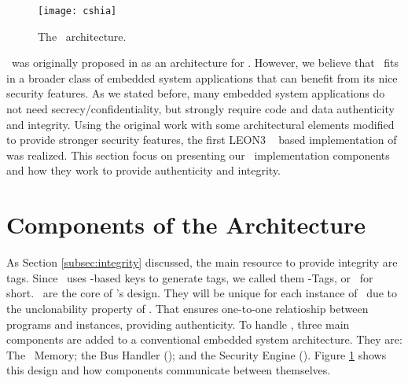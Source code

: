 

\begin{figure}[!ht]
	\centering
	\texttt{[image: cshia]}
	\caption{The \cshia~architecture.}
	\label{fig:cshia}
\end{figure}

\cshia~was originally proposed in \cite{Hoffman2015} as an architecture for \iot. However, we believe that \cshia~fits in a broader class of embedded system applications that can benefit from its nice security features. As we stated before, many embedded system applications do not need secrecy\slash{}confidentiality, but strongly require code and data authenticity and integrity. 
Using the original work with some architectural elements modified to provide stronger security features, the first LEON3 \fpga~ based implementation of \cshia was realized. This section focus on presenting our \cshia~implementation components and how they work to provide authenticity and integrity.

\section{Components of the Architecture}
\label{sec:Components-of-the-Architecture}
As Section \ref{subsec:integrity} discussed, the main resource to provide integrity are tags. Since \cshia~uses \puf-based keys to generate tags, we called them \puf-Tags, or \ptags~for short. \ptags~are the core of \cshia's design. They will be unique for each instance of \cshia~due to the unclonability property of \pufs. That ensures one-to-one relatioship between programs and instances, providing authenticity. To handle \ptags, three main components are added to a conventional embedded system architecture. They are: The \ptag~Memory; the Bus Handler (\handler); and the Security Engine (\seceng). Figure \ref{fig:cshia} shows this design and how components communicate between themselves. 

